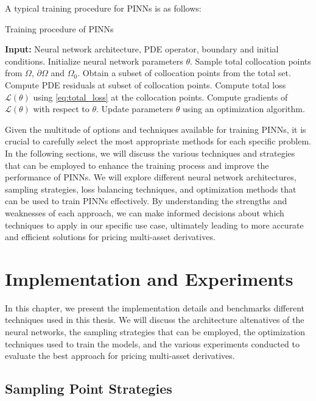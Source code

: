 \documentclass[12pt]{report} %
\theoremstyle{plain}           %
\theoremstyle{definition}      %
\theoremstyle{remark}          %
\begin{document}
A typical training procedure for PINNs is as follows:

\begin{algorithm}[H]
	\caption{Training procedure of PINNs}
	\begin{algorithmic}[1]
	\STATE \textbf{Input:} Neural network architecture, PDE operator, boundary and initial conditions.
	\STATE Initialize neural network parameters $\theta$.
	\STATE Sample total collocation points from $\Omega$, $\partial\Omega$ and $\Omega_0$.
	  \STATE Obtain a subset of collocation points from the total set.
	  \STATE Compute PDE residuals at subset of collocation points.
	  \STATE Compute total loss $\mathcal{L}(\theta)$ using \eqref{eq:total_loss} at the collocation points.
	  \STATE Compute gradients of $\mathcal{L}(\theta)$ with respect to $\theta$.
	  \STATE Update parameters $\theta$ using an optimization algorithm.
	\ENDWHILE
	\end{algorithmic}
	\label{alg:training_pinns}
\end{algorithm}

Given the multitude of options and techniques available for training PINNs, it is crucial to
carefully select the most appropriate methods for each specific problem. In the following sections,
we will discuss the various techniques and strategies that can be employed to enhance the training process
and improve the performance of PINNs. We will explore different neural network architectures,
sampling strategies, loss balancing techniques, and optimization methods that can be used to
train PINNs effectively. By understanding the strengths and weaknesses of each approach, we can
make informed decisions about which techniques to apply in our specific use case, ultimately leading to
more accurate and efficient solutions for pricing multi-asset derivatives.


\chapter{Implementation and Experiments}

In this chapter, we present the implementation details and benchmarks different techniques used in this thesis.
We will discuss the architecture altenatives of the neural networks, the sampling strategies that can be employed,
the optimization techniques used to train the models, and the various experiments conducted to evaluate 
the best approach for pricing multi-asset derivatives.

\section{Sampling Point Strategies}
\end{document}

